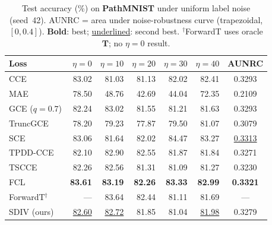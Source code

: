 \begin{table}[t]
\centering
\caption{Test accuracy (\%) on \textbf{PathMNIST} under uniform label noise
(seed~42). AUNRC = area under noise-robustness curve (trapezoidal, $[0,0.4]$).
\textbf{Bold}: best; \underline{underlined}: second best.
$^{\dagger}$ForwardT uses oracle $\mathbf{T}$; no $\eta{=}0$ result.}
\label{tab:noise_medical}
\footnotesize
\setlength{\tabcolsep}{3pt}
\begin{tabular}{@{}lrrrrrc@{}}
\toprule
\textbf{Loss} & $\eta{=}0$ & $\eta{=}10$ & $\eta{=}20$ & $\eta{=}30$ & $\eta{=}40$ & \textbf{AUNRC} \\
\midrule
CCE               & 83.02              & 81.03              & 81.13              & 82.02              & 82.41              & 0.3293 \\
MAE               & 78.50              & 48.76              & 42.69              & 44.04              & 72.35              & 0.2109 \\
GCE ($q{=}0.7$)   & 82.24              & 83.02              & 81.55              & 81.21              & 81.63              & 0.3293 \\
TruncGCE          & 78.20              & 79.23              & 77.87              & 79.50              & 81.07              & 0.3079 \\
SCE               & 83.06              & 81.64              & 82.02              & 84.47              & 83.27              & \underline{0.3313} \\
TPDD-CCE          & 82.10              & 82.90              & 82.55              & 81.87              & 81.84              & 0.3271 \\
TSCCE             & 82.26              & 82.56              & 81.31              & 81.09              & 81.27              & 0.3230 \\
FCL               & \textbf{83.61}     & \textbf{83.19}     & \textbf{82.26}     & \textbf{83.33}     & \textbf{82.99}     & \textbf{0.3321} \\
ForwardT$^{\dagger}$ & ---             & 83.64              & 82.44              & 81.11              & 81.69              & --- \\
SDIV (ours)       & \underline{82.60}  & \underline{82.72}  & 81.85              & 81.04              & \underline{81.98}  & 0.3279 \\
\bottomrule
\end{tabular}
\end{table}

